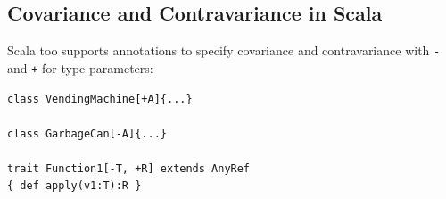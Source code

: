 \subsection{Covariance and Contravariance in Scala}
Scala too supports annotations to specify covariance and contravariance with \verb|-| and \verb|+| for type parameters:
\begin{verbatim}
class VendingMachine[+A]{...}

class GarbageCan[-A]{...}

trait Function1[-T, +R] extends AnyRef
{ def apply(v1:T):R }
\end{verbatim}





